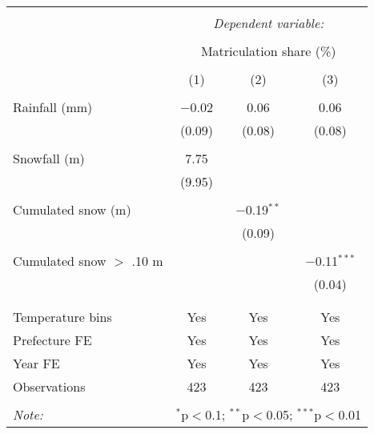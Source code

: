
\begin{tabular}{@{\extracolsep{5pt}}lccc} 
\\[-1.8ex]\hline 
\hline \\[-1.8ex] 
 & \multicolumn{3}{c}{\textit{Dependent variable:}} \\ 
\cline{2-4} 
\\[-1.8ex] & \multicolumn{3}{c}{Matriculation share (\%)} \\ 
\\[-1.8ex] & (1) & (2) & (3)\\ 
\hline \\[-1.8ex] 
 Rainfall (mm) & $-$0.02 & 0.06 & 0.06 \\ 
  & (0.09) & (0.08) & (0.08) \\ 
  & & & \\ 
 Snowfall (m) & 7.75 &  &  \\ 
  & (9.95) &  &  \\ 
  & & & \\ 
 Cumulated snow (m) &  & $-$0.19$^{**}$ &  \\ 
  &  & (0.09) &  \\ 
  & & & \\ 
 Cumulated snow $>$ .10 m &  &  & $-$0.11$^{***}$ \\ 
  &  &  & (0.04) \\ 
  & & & \\ 
\hline \\[-1.8ex] 
Temperature bins & Yes & Yes & Yes \\ 
Prefecture FE & Yes & Yes & Yes \\ 
Year FE & Yes & Yes & Yes \\ 
Observations & 423 & 423 & 423 \\ 
\hline 
\hline \\[-1.8ex] 
\textit{Note:}  & \multicolumn{3}{r}{$^{*}$p$<$0.1; $^{**}$p$<$0.05; $^{***}$p$<$0.01} \\ 
\end{tabular} 
